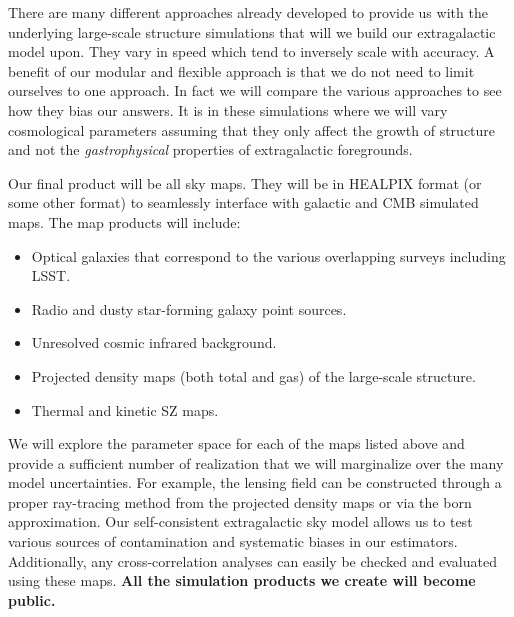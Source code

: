 There are many different approaches already developed to provide us with the underlying large-scale structure simulations that will we build our extragalactic model upon. They vary in speed which tend to inversely scale with accuracy. A benefit of our modular and flexible approach is that we do not need to limit ourselves to one approach. In fact we will compare the various approaches to see how they bias our answers. It is in these simulations where we will vary cosmological parameters assuming that they only affect the growth of structure and not the {\it gastrophysical} properties of extragalactic foregrounds.

Our final product will be all sky maps. They will be in HEALPIX format (or some other format) to seamlessly interface with galactic and CMB simulated maps. The map products will include:

\begin{itemize}
\item Optical galaxies that correspond to the various overlapping surveys including LSST.
\item Radio and dusty star-forming galaxy point sources.
\item Unresolved cosmic infrared background.
\item Projected density maps (both total and gas) of the large-scale structure.
\item Thermal and kinetic SZ maps.
\end{itemize}

\noindent We will explore the parameter space for each of the maps listed above and provide a sufficient number of realization that we will marginalize over the many model uncertainties. For example, the lensing field can be constructed through a proper ray-tracing method from the projected density maps or via the born approximation. Our self-consistent extragalactic sky model allows us to test various sources of contamination and systematic biases in our estimators. Additionally, any cross-correlation analyses can easily be checked and evaluated using these maps. {\bf All the simulation products we create will become public.}

%



